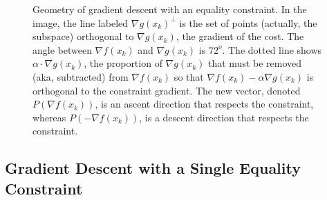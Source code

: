 \begin{figure}[hbt]
    \centering


    \caption{Geometry of gradient descent with an equality constraint. In the image, the line labeled $\nabla g(x_k)^\perp$ is the set of points (actually, the subspace) orthogonal to $\nabla g(x_k)$, the gradient of the cost. The angle between $\nabla f(x_k)$ and $\nabla g(x_k)$ is $72^o$. The dotted line shows $\alpha \cdot \nabla g(x_k)$, the proportion of $\nabla g(x_k)$ that must be removed (aka, subtracted) from $\nabla f(x_k)$ so that $\nabla f(x_k) - \alpha \nabla g(x_k)$  is orthogonal to the constraint gradient. The new vector, denoted $P(\nabla f(x_k))$, is an ascent direction that respects the constraint, whereas $P(-\nabla f(x_k))$, is a descent direction that respects the constraint.}
    \label{fig:OthogonalProjectionGradientOnComplementGradg}
\end{figure}

\subsection{Gradient Descent with a Single Equality Constraint}

